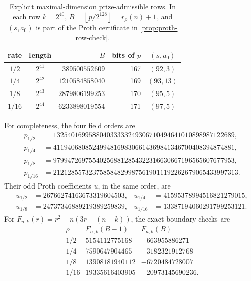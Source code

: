 \documentclass[11pt,a4paper]{amsart}
\numberwithin{equation}{section}
\theoremstyle{remark}
\newcommand{\floor}[1]{\left\lfloor #1\right\rfloor}
\begin{document}
\begin{table}[H]
\centering
\caption{Explicit maximal-dimension prize-admissible rows.  In each row
\(k=2^{40}\), \(B=\floor{p/2^{128}}=r_\rho(n)+1\), and \((s,a_0)\) is part of
the Proth certificate in \cref{prop:proth-row-check}.}
\label{tab:prize-proth-rows}
\small
\begin{tabular}{@{}ccrrc@{}}
\hline
rate & length & \(B\) & bits of \(p\) & \((s,a_0)\)\\
\hline
\(1/2\)  & \(2^{41}\) & \(389500552609\)  & 167 & \((92,3)\)\\
\(1/4\)  & \(2^{42}\) & \(1210584858040\) & 169 & \((93,13)\)\\
\(1/8\)  & \(2^{43}\) & \(2879806199253\) & 170 & \((95,5)\)\\
\(1/16\) & \(2^{44}\) & \(6233898019554\) & 171 & \((97,5)\)\\
\hline
\end{tabular}
\end{table}

For completeness, the four field orders are
\begin{align*}
p_{1/2}&=132540169958804033333249306710494641010898987122689,\\
p_{1/4}&=411940680852499481698306614369841346700408394874881,\\
p_{1/8}&=979947269755402568812854322316630667196565607677953,\\
p_{1/16}&=2121285573237585848299875619011192262679065433997313.
\end{align*}
Their odd Proth coefficients \(u\), in the same order, are
\begin{align*}
u_{1/2}&=26766274163673319604503,
&u_{1/4}&=41595378994516821279015,\\
u_{1/8}&=24737346889219389259839,
&u_{1/16}&=13387194060291799253121.
\end{align*}
For \(F_{n,k}(r)=r^2-n(3r-(n-k))\), the exact boundary checks are
\[
\begin{array}{c|r|r}
 \rho&F_{n,k}(B-1)&F_{n,k}(B)\\ \hline
 1/2&5154112775168&-663955886271\\
 1/4&7590647904465&-3182321912768\\
 1/8&13908181940112&-6720484728007\\
 1/16&19335616403905&-20973145690236.
\end{array}                                                    \tag{PC0}
\label{eq:quadratic-row-certificates}
\]
\end{document}
